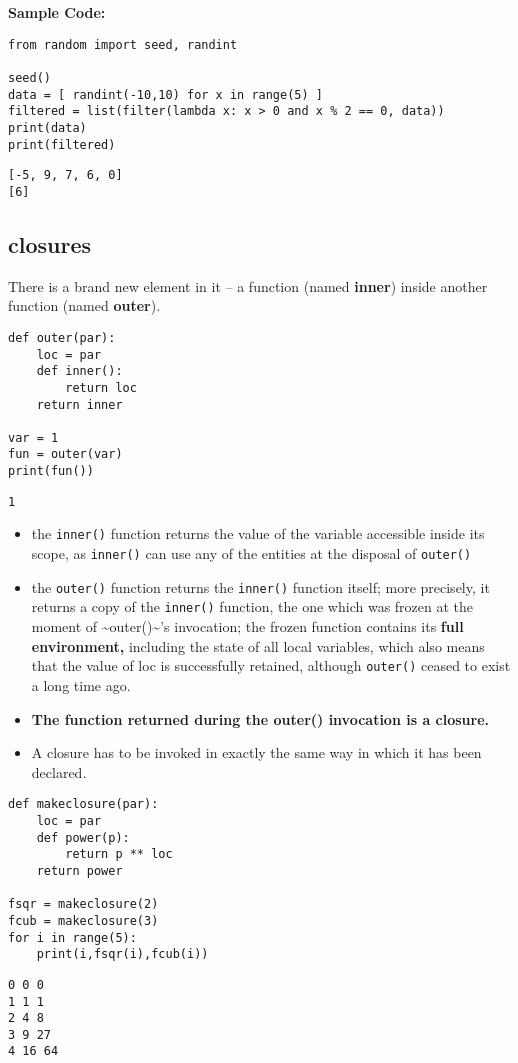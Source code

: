 \documentclass[11pt]{article}
\begin{document}
\textbf{Sample Code:}

\begin{verbatim}
from random import seed, randint

seed()
data = [ randint(-10,10) for x in range(5) ]
filtered = list(filter(lambda x: x > 0 and x % 2 == 0, data))
print(data)
print(filtered)
\end{verbatim}

\begin{verbatim}
[-5, 9, 7, 6, 0]
[6]
\end{verbatim}
\vspace{10 mm}

\subsection{closures}
\label{sec:org02abed3}
There is a brand new element in it – a function (named \textbf{inner}) inside
another function (named \textbf{outer}).

\begin{verbatim}
def outer(par):
	loc = par
	def inner():
		return loc
	return inner

var = 1
fun = outer(var)
print(fun())
\end{verbatim}

\begin{verbatim}
1
\end{verbatim}

\vspace{10 mm}

\begin{itemize}
\item the \texttt{inner()} function returns the value of the variable accessible
inside its scope, as \texttt{inner()} can use any of the entities at the
disposal of \texttt{outer()}
\item the \texttt{outer()} function returns the \texttt{inner()} function itself; more
precisely, it returns a copy of the \texttt{inner()} function, the one
which was frozen at the moment of \textasciitilde{}outer()\textasciitilde{}’s invocation; the frozen
function contains its \textbf{full environment,} including the state of all
local variables, which also means that the value of loc is
successfully retained, although \texttt{outer()} ceased to exist a long time
ago.

\item \textbf{The function returned during the outer() invocation is a closure.}

\item A closure has to be invoked in exactly the same way in which it has been declared.
\end{itemize}

\begin{verbatim}
def makeclosure(par):
	loc = par
	def power(p):
		return p ** loc
	return power

fsqr = makeclosure(2)
fcub = makeclosure(3)
for i in range(5):
	print(i,fsqr(i),fcub(i))
\end{verbatim}

\begin{verbatim}
0 0 0
1 1 1
2 4 8
3 9 27
4 16 64
\end{verbatim}
\end{document}

